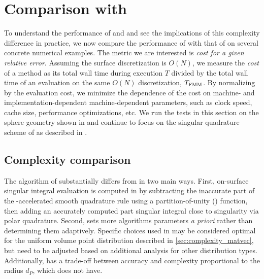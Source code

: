 \section{Comparison with \cite{YBZ}\label{app:results-compare}}

To understand the performance of \cite{YBZ} and \qbkix and see the implications of this complexity difference in practice, we now compare the performance of \qbkix with that of \cite{YBZ} on several concrete numerical examples.
The metric we are interested is \textit{cost for a given relative error}.
Assuming the surface discretization is $O(N)$, we measure the \textit{cost} of a method as its total wall time during execution $T$ divided by the total wall time of an \fmm evaluation on the same $O(N)$ discretization, $T_{\mathrm{FMM}}$. 
By normalizing by the \fmm evaluation cost, we minimize the dependence of the cost on machine- and implementation-dependent machine-dependent parameters, such as clock speed, cache size, performance optimizations, etc.
We run the tests in this section on the sphere geometry shown in \cite[Figure 8-left]{morse2020robust}  and continue to focus on the singular quadrature scheme of \cite{YBZ} as described in \cite[Section 6.2]{morse2020robust}. 



\subsection{Complexity comparison}  

The algorithm of \cite{YBZ} substantially differs from \qbkix in two main ways.
First, on-surface singular integral evaluation is computed in \cite{YBZ} by subtracting the inaccurate part of the \fmm-accelerated smooth quadrature rule using a partition-of-unity (\pou) function, then adding an accurately computed part singular integral close to singularity via polar quadrature.
Second, \cite{YBZ} sets more algorithms parameters \emph{a priori} rather than determining them adaptively.
Specific choices used in  \cite{YBZ} may be considered  optimal for the uniform volume point distribution described in \cref{sec:complexity_matvec}, but need to be adjusted based on additional analysis for other distribution types. Additionally, \cite{YBZ} has a trade-off between accuracy and complexity proportional to the \pou radius $d_P$, which \qbkix does not have.

